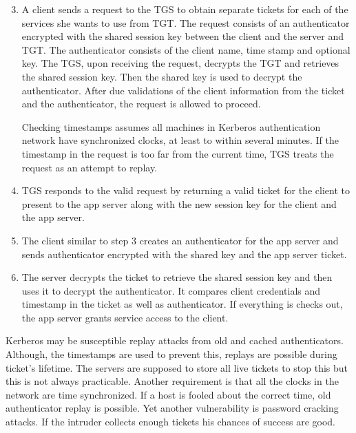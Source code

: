 \begin{multicols}{2}
\begin{enumerate}
\setcounter{enumi}{2}
\item A client sends a request to the TGS to obtain separate tickets for each of the services she wants to use from TGT. The request consists of an authenticator encrypted with the shared session key between the client and the server and TGT. The authenticator consists of the client name, time stamp and optional key. The TGS, upon receiving the request, decrypts the TGT and retrieves the shared session key. Then the shared key is used to decrypt the authenticator. After due validations of the client information from the ticket and the authenticator, the request is allowed to proceed.

Checking timestamps assumes all machines in Kerberos authentication network have synchronized clocks, at least to within several minutes. If the timestamp in the request is too far from the current time, TGS treats the request as an attempt to replay.

\item TGS responds to the valid request by returning a valid ticket for the client to present to the app server along with the new session key for the client and the app server.

\item The client similar to step 3 creates an authenticator for the app server and sends authenticator encrypted with the shared key and the app server ticket.

\item The server decrypts the ticket to retrieve the shared session key and then uses it to decrypt the authenticator. It compares client credentials and timestamp in the ticket as well as authenticator. If everything is checks out, the app server grants service access to the client.
\end{enumerate}

Kerberos may be susceptible replay attacks from old and cached authenticators. Although, the timestamps are used to prevent this, replays are possible during ticket's lifetime. The servers are supposed to store all live tickets to stop this but this is not always practicable. Another requirement is that all the clocks in the network are time synchronized. If a host is fooled about the correct time, old authenticator replay is possible. Yet another vulnerability is password cracking attacks. If the intruder collects enough tickets his chances of success are good.


\end{multicols}
